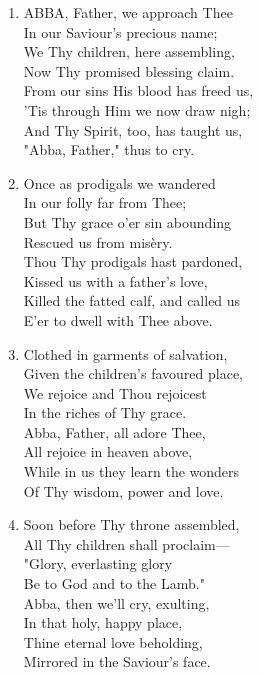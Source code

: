 \begin{enumerate}
    \item ABBA, Father, we approach Thee \\
        In our Saviour's precious name; \\
        We Thy children, here assembling, \\
        Now Thy promised blessing claim. \\
        From our sins His blood has freed us, \\
        'Tis through Him we now draw nigh; \\
        And Thy Spirit, too, has taught us, \\
        "Abba, Father," thus to cry.

    \item Once as prodigals we wandered \\
        In our folly far from Thee; \\
        But Thy grace o'er sin abounding \\
        Rescued us from mis\`ery. \\
        Thou Thy prodigals hast pardoned, \\
        Kissed us with a father's love, \\
        Killed the fatted calf, and called us \\
        E'er to dwell with Thee above.

    \item Clothed in garments of salvation, \\
        Given the children's favoured place, \\
        We rejoice and Thou rejoicest \\
        In the riches of Thy grace. \\
        Abba, Father, all adore Thee, \\
        All rejoice in heaven above, \\
        While in us they learn the wonders \\
        Of Thy wisdom, power and love.

    \item Soon before Thy throne assembled, \\
        All Thy children shall proclaim--- \\
        "Glory, everlasting glory \\
        Be to God and to the Lamb." \\
        Abba, then we'll cry, exulting, \\
        In that holy, happy place, \\
        Thine eternal love beholding, \\
        Mirrored in the Saviour's face.

\end{enumerate}

